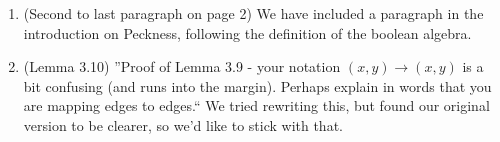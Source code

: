 \documentclass[10 pt]{amsart}
\theoremstyle{plain}
\theoremstyle{definition}
\theoremstyle{remark}
\numberwithin{equation}{section}
\begin{document}
\begin{enumerate}
	\item (Second to last paragraph on page 2) We have included a paragraph in the introduction on Peckness, following the definition of the boolean algebra.
	\item (Lemma 3.10) ''Proof of Lemma 3.9 - your notation $(x,y)\rightarrow (x,y)$ is a bit confusing (and runs into the margin). Perhaps explain in words that you are mapping edges to edges.`` We tried rewriting this, but found our original version to be clearer, so we'd like to stick with that.
\end{enumerate}
\end{document}
